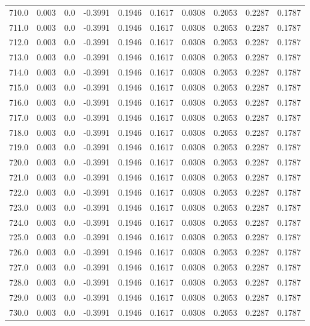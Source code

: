 \begin{longtable}{lrrrrrrrrr}
710.0 & 0.003 & 0.0 & -0.3991 & 0.1946 & 0.1617 & 0.0308 & 0.2053 & 0.2287 & 0.1787 \\
711.0 & 0.003 & 0.0 & -0.3991 & 0.1946 & 0.1617 & 0.0308 & 0.2053 & 0.2287 & 0.1787 \\
712.0 & 0.003 & 0.0 & -0.3991 & 0.1946 & 0.1617 & 0.0308 & 0.2053 & 0.2287 & 0.1787 \\
713.0 & 0.003 & 0.0 & -0.3991 & 0.1946 & 0.1617 & 0.0308 & 0.2053 & 0.2287 & 0.1787 \\
714.0 & 0.003 & 0.0 & -0.3991 & 0.1946 & 0.1617 & 0.0308 & 0.2053 & 0.2287 & 0.1787 \\
715.0 & 0.003 & 0.0 & -0.3991 & 0.1946 & 0.1617 & 0.0308 & 0.2053 & 0.2287 & 0.1787 \\
716.0 & 0.003 & 0.0 & -0.3991 & 0.1946 & 0.1617 & 0.0308 & 0.2053 & 0.2287 & 0.1787 \\
717.0 & 0.003 & 0.0 & -0.3991 & 0.1946 & 0.1617 & 0.0308 & 0.2053 & 0.2287 & 0.1787 \\
718.0 & 0.003 & 0.0 & -0.3991 & 0.1946 & 0.1617 & 0.0308 & 0.2053 & 0.2287 & 0.1787 \\
719.0 & 0.003 & 0.0 & -0.3991 & 0.1946 & 0.1617 & 0.0308 & 0.2053 & 0.2287 & 0.1787 \\
720.0 & 0.003 & 0.0 & -0.3991 & 0.1946 & 0.1617 & 0.0308 & 0.2053 & 0.2287 & 0.1787 \\
721.0 & 0.003 & 0.0 & -0.3991 & 0.1946 & 0.1617 & 0.0308 & 0.2053 & 0.2287 & 0.1787 \\
722.0 & 0.003 & 0.0 & -0.3991 & 0.1946 & 0.1617 & 0.0308 & 0.2053 & 0.2287 & 0.1787 \\
723.0 & 0.003 & 0.0 & -0.3991 & 0.1946 & 0.1617 & 0.0308 & 0.2053 & 0.2287 & 0.1787 \\
724.0 & 0.003 & 0.0 & -0.3991 & 0.1946 & 0.1617 & 0.0308 & 0.2053 & 0.2287 & 0.1787 \\
725.0 & 0.003 & 0.0 & -0.3991 & 0.1946 & 0.1617 & 0.0308 & 0.2053 & 0.2287 & 0.1787 \\
726.0 & 0.003 & 0.0 & -0.3991 & 0.1946 & 0.1617 & 0.0308 & 0.2053 & 0.2287 & 0.1787 \\
727.0 & 0.003 & 0.0 & -0.3991 & 0.1946 & 0.1617 & 0.0308 & 0.2053 & 0.2287 & 0.1787 \\
728.0 & 0.003 & 0.0 & -0.3991 & 0.1946 & 0.1617 & 0.0308 & 0.2053 & 0.2287 & 0.1787 \\
729.0 & 0.003 & 0.0 & -0.3991 & 0.1946 & 0.1617 & 0.0308 & 0.2053 & 0.2287 & 0.1787 \\
730.0 & 0.003 & 0.0 & -0.3991 & 0.1946 & 0.1617 & 0.0308 & 0.2053 & 0.2287 & 0.1787 \\

\end{longtable}
